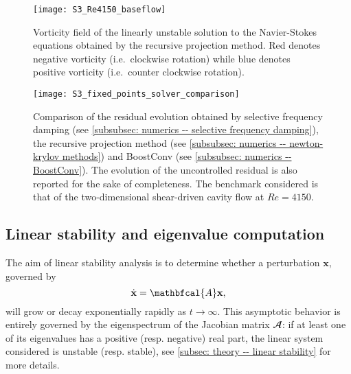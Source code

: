     \begin{figure}[b]
      \sidecaption
      \centering
      \texttt{[image: S3\_Re4150\_baseflow]}
      \caption{Vorticity field of the linearly unstable solution to the Navier-Stokes equations obtained by the recursive projection method. Red denotes negative vorticity (i.e.\ clockwise rotation) while blue denotes positive vorticity (i.e.\ counter clockwise rotation).}
      \label{fig: numerics -- comparison of sfd, boostconv, rpm}
    \end{figure}

    \begin{figure}[b]
      \centering
      \texttt{[image: S3\_fixed\_points\_solver\_comparison]}
      \caption{Comparison of the residual evolution obtained by selective frequency damping (see \textsection \ref{subsubsec: numerics -- selective frequency damping}), the recursive projection method (see \textsection \ref{subsubsec: numerics --  newton-krylov methods}) and BoostConv (see \textsection \ref{subsubsec: numerics -- BoostConv}). The evolution of the uncontrolled residual is also reported for the sake of completeness. The benchmark considered is that of the two-dimensional shear-driven cavity flow at $Re = 4150$.}
      \label{fig: numerics -- comparison of sfd, boostconv, rpm bis}
    \end{figure}


  \subsection{Linear stability and eigenvalue computation}

  The aim of linear stability analysis is to determine whether a perturbation $\textbf{x}$, governed by
  \begin{equation}
    \dot{ \mathbf{x} } = \mathbfcal{A} \mathbf{x},
    \notag
  \end{equation}
  will grow or decay exponentially rapidly as $t \to \infty$. This asymptotic behavior is entirely governed by the eigenspectrum of the Jacobian matrix $\mathbfcal{A}$: if at least one of its eigenvalues has a positive (resp. negative) real part, the linear system considered is unstable (resp. stable), see \textsection \ref{subsec: theory -- linear stability} for more details.

